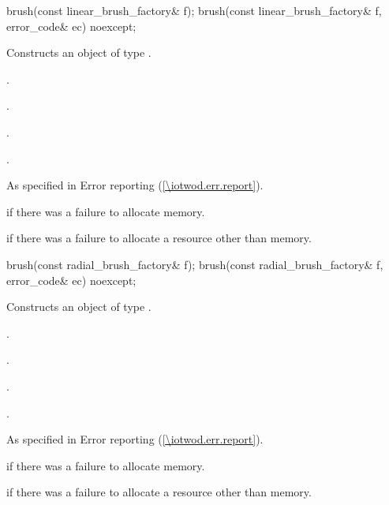 \begin{itemdecl}
    brush(const linear_brush_factory& f);
    brush(const linear_brush_factory& f, error_code& ec) noexcept;
\end{itemdecl}
\begin{itemdescr}
	\pnum
	\effects
	Constructs an object of type .
	
	\pnum
	\postconditions
	.
	
	.
	
	.
	
	.

	\pnum
	\throws
	As specified in Error reporting (\ref{\iotwod.err.report}).
	
	\pnum
	\errors
	 if there was a failure to allocate memory.
	
	 if there was a failure to allocate a resource other than memory.
	
\end{itemdescr}

\begin{itemdecl}
    brush(const radial_brush_factory& f);
    brush(const radial_brush_factory& f, error_code& ec) noexcept;
\end{itemdecl}
\begin{itemdescr}
	\pnum
	\effects
	Constructs an object of type .
	
	\pnum
	\postconditions
	.
	
	.
	
	.
	
	.

	\pnum
	\throws
	As specified in Error reporting (\ref{\iotwod.err.report}).
	
	\pnum
	\errors
	 if there was a failure to allocate memory.
	
	 if there was a failure to allocate a resource other than memory.
	
\end{itemdescr}

